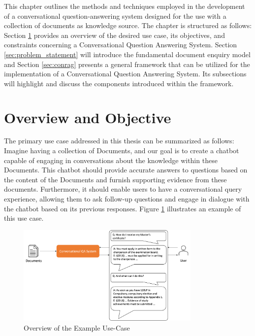 This chapter outlines the methods and techniques employed in the development of a conversational question-answering system designed for the use with a collection of documents as knowledge source. The chapter is structured as follows: Section \ref{sec:overview} provides an overview of the desired use case, its objectives, and constraints concerning a Conversational Question Answering System. Section \ref{sec:problem_statement} will introduce the fundamental document enquiry model and Section \ref{sec:conrag} presents a general framework that can be utilized for the implementation of a Conversational Question Answering System. Its subsections will highlight and discuss the components introduced within the framework.

\section{Overview and Objective}
\label{sec:overview}

The primary use case addressed in this thesis can be summarized as follows: Imagine having a collection of Documents, and our goal is to create a chatbot capable of engaging in conversations about the knowledge within these Documents. This chatbot should provide accurate answers to questions based on the content of the Documents and furnish supporting evidence from these documents. Furthermore, it should enable users to have a conversational query experience, allowing them to ask follow-up questions and engage in dialogue with the chatbot based on its previous responses. Figure \ref{fig:use-case} illustrates an example of this use case.

\begin{figure}
    \centering
    \includegraphics[width=0.8\textwidth]{Grafiken/Use_Case.png}
    \caption{Overview of the Example Use-Case}
    \label{fig:use-case}
\end{figure}

